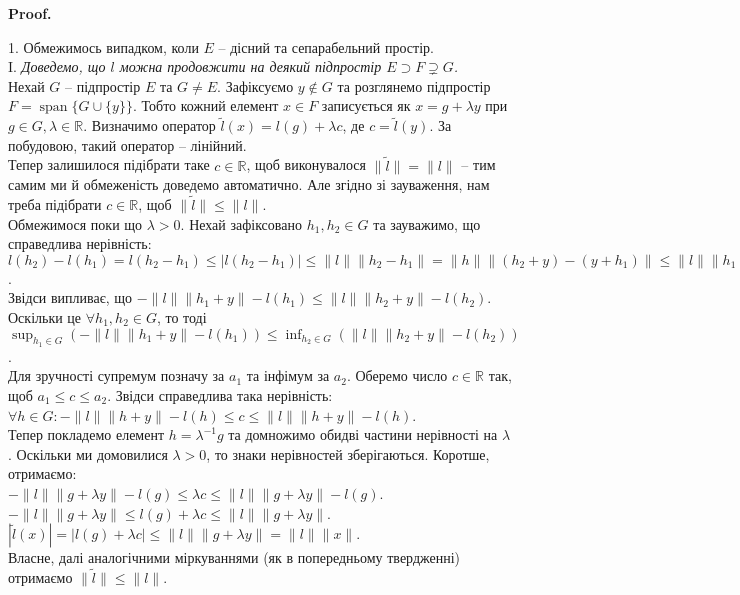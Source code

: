 \documentclass[a4paper, 10pt]{article}
\makeatletter
\theoremstyle{theoremdd}
\theoremstyle{theoremdd}
\theoremstyle{theoremdd}
\theoremstyle{theoremdd}
\theoremstyle{theoremdd}
\theoremstyle{theoremdd}
\theoremstyle{theoremdd}
\theoremstyle{theoremdd}
\renewenvironment{proof}[1][Proof.\\]{\par
\pushQED{\hfill \qed}%
\normalfont \topsep6\p@\@plus6\p@\relax
\trivlist
\item\relax
{\bfseries
#1\@addpunct{.}}\hspace\labelsep\ignorespaces
}{%
\popQED\endtrivlist\@endpefalse
}
\DeclareMathOperator{\linspan}{span}
\makeatother
\begin{document}
\begin{proof}
1. Обмежимось випадком, коли $E$ -- дісний та сепарабельний простір.\\
I. \textit{Доведемо, що $l$ можна продовжити на деякий підпростір $E \supset F \supsetneq G$.}\\
Нехай $G$ -- підпростір $E$ та $G \neq E$. Зафіксуємо $y \notin G$ та розглянемо підпростір $F = \linspan\{G \cup \{y\}\}$. Тобто кожний елемент $x \in F$ записується як $x = g + \lambda y$ при $g \in G, \lambda \in \mathbb{R}$. Визначимо оператор $\tilde{l}(x) = l(g) + \lambda c$, де $c = \tilde{l}(y)$. За побудовою, такий оператор -- лінійний.\\
Тепер залишилося підібрати таке $c \in \mathbb{R}$, щоб виконувалося $\|\tilde{l}\| = \|l\|$ -- тим самим ми й обмеженість доведемо автоматично. Але згідно зі зауваження, нам треба підібрати $c \in \mathbb{R}$, щоб $\|\tilde{l}\| \leq \|l\|$.\\
Обмежимося поки що $\lambda > 0$. Нехай зафіксовано $h_1,h_2 \in G$ та зауважимо, що справедлива нерівність:\\
$l(h_2) - l(h_1) = l(h_2-h_1) \leq |l(h_2-h_1)| \leq \|l\| \|h_2 - h_1\| = \|h \| \|(h_2+y) - (y+h_1)\| \leq \|l\| \|h_1+y\| + \|l\| \|h_2+y\|$.\\
Звідси випливає, що $-\|l\| \|h_1+y\| - l(h_1) \leq \|l\| \|h_2+y\| - l(h_2)$.\\
Оскільки це $\forall h_1,h_2 \in G$, то тоді $\displaystyle\sup_{h_1 \in G} (-\|l\| \|h_1+y\| - l(h_1)) \leq \inf_{h_2 \in G} ( \|l\| \|h_2+y\| - l(h_2))$.\\
Для зручності супремум позначу за $a_1$ та інфімум за $a_2$. Оберемо число $c \in \mathbb{R}$ так, щоб $a_1 \leq c \leq a_2$. Звідси справедлива така нерівність:\\
$\forall h \in G: -\|l\| \|h+y\| - l(h) \leq c \leq \|l\| \|h+y\| - l(h)$.\\
Тепер покладемо елемент $h = \lambda^{-1}g$ та домножимо обидві частини нерівності на $\lambda$. Оскільки ми домовилися $\lambda > 0$, то знаки нерівностей зберігаються. Коротше, отримаємо:\\
$-\|l\| \|g+\lambda y \| - l(g) \leq \lambda c \leq \|l\| \|g + \lambda y \| - l(g)$.\\
$-\|l\| \|g+\lambda y\| \leq l(g) + \lambda c \leq \|l\| \|g+\lambda y\|$.\\
$|\tilde{l}(x)| = |l(g) + \lambda c| \leq \|l\| \|g + \lambda y\| = \|l\| \|x\|$.\\
Власне, далі аналогічними міркуваннями (як в попередньому твердженні) отримаємо $\|\tilde{l}\| \leq \|l\|$.\\

\end{proof}
\end{document}
